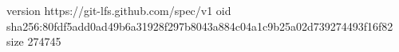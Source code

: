 version https://git-lfs.github.com/spec/v1
oid sha256:80fdf5add0ad49b6a31928f297b8043a884c04a1c9b25a02d739274493f16f82
size 274745

